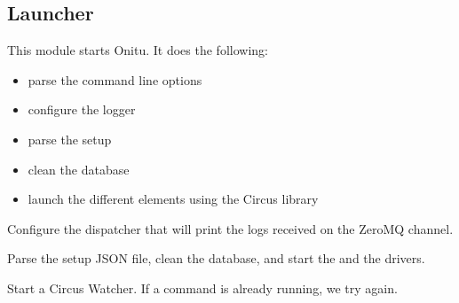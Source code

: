 \documentclass[letterpaper,10pt,english]{sphinxmanual}
\begin{document}
\subsection{Launcher}
\label{components:launcher}\label{components:module-onitu.__main__}
This module starts Onitu. It does the following:
\begin{itemize}
\item {} 
parse the command line options

\item {} 
configure the logger

\item {} 
parse the setup

\item {} 
clean the database

\item {} 
launch the different elements using the Circus library

\end{itemize}

\begin{fulllineitems}
\label{components:onitu.__main__.get_logs_dispatcher}
Configure the dispatcher that will print the logs received
on the ZeroMQ channel.

\end{fulllineitems}


\begin{fulllineitems}
\label{components:onitu.__main__.start_setup}
Parse the setup JSON file, clean the database,
and start the {\hyperref[components:onitu.referee.Referee]{}} and the drivers.

\end{fulllineitems}


\begin{fulllineitems}
\label{components:onitu.__main__.start_watcher}
Start a Circus Watcher.
If a command is already running, we try again.

\end{fulllineitems}
\end{document}
